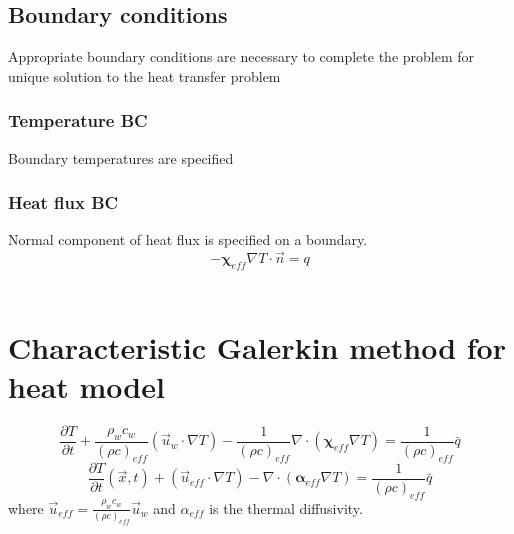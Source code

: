 \subsection{Boundary conditions}
Appropriate boundary conditions are necessary to complete the problem for unique solution to the heat transfer problem
\subsubsection{Temperature BC}
Boundary temperatures are specified
\subsubsection{Heat flux BC}
Normal component of heat flux is specified on a boundary. 
\begin{equation}
-\mathbf{\chi}_{eff}\nabla T\cdot\vec{n}=q
\end{equation}
\\
\section{Characteristic Galerkin method for heat model}
\begin{equation}
\frac{\partial T}{\partial t} + \frac{\rho_wc_w}{(\rho c )_{eff}}(\vec{u}_w\cdot\nabla T)-\frac{1}{(\rho c )_{eff}}\nabla\cdot(\mathbf{\chi}_{eff}\nabla T)=\frac{1}{(\rho c )_{eff}}\bar{q}
\end{equation}
%
\begin{equation}
\frac{\partial T}{\partial t}(\vec{x},t) + (\vec{u}_{eff}\cdot\nabla T)-\nabla\cdot(\mathbf{\alpha}_{eff}\nabla T)=\frac{1}{(\rho c )_{eff}}\bar{q}
\end{equation}
%
where $\vec{u}_{eff} =  \frac{\rho_wc_w}{(\rho c )_{eff}}\vec{u}_w$ and $\alpha_{eff}$ is the thermal diffusivity.

